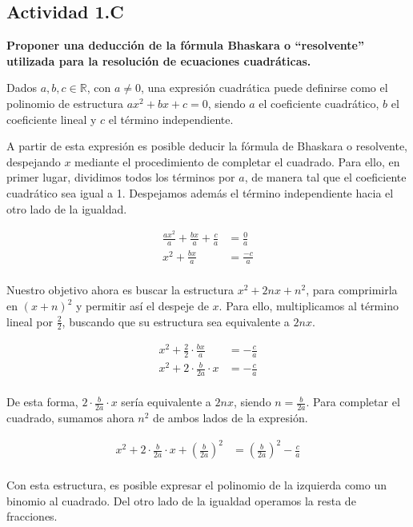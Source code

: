 \subsection*{Actividad 1.C}
\textbf{Proponer una deducción de la fórmula Bhaskara o “resolvente”
	utilizada para la resolución de ecuaciones cuadráticas.}

Dados $a, b, c \in \mathbb{R}$, con $a \neq 0$, una expresión cuadrática puede definirse como el polinomio de estructura $ax^2 + bx + c = 0$, siendo $a$ el coeficiente cuadrático, $b$ el coeficiente lineal y $c$ el término independiente.

A partir de esta expresión es posible deducir la fórmula de Bhaskara o resolvente, despejando $x$ mediante el procedimiento de completar el cuadrado. Para ello, en primer lugar, dividimos todos los términos por $a$, de manera tal que el coeficiente cuadrático sea igual a 1. Despejamos además el término independiente hacia el otro lado de la igualdad.

\begin{align*}
	\frac{ax^2}{a} + \frac{bx}{a} + \frac{c}{a} & = \frac{0}{a}  \\
	x^2 + \frac{bx}{a}                          & = \frac{-c}{a} \\
\end{align*}

Nuestro objetivo ahora es buscar la estructura $x^2 + 2nx + n^2$, para comprimirla en $(x+n)^2$ y permitir así el despeje de $x$. Para ello, multiplicamos al término lineal por $\frac{2}{2}$, buscando que su estructura sea equivalente a $2nx$.

\begin{align*}
	x^2 + \frac{2}{2} \cdot \frac{bx}{a} & = - \frac{c}{a} \\
	x^2 + 2 \cdot \frac{b}{2a} \cdot x   & = - \frac{c}{a} \\
\end{align*}

De esta forma, $2 \cdot \frac{b}{2a} \cdot x$ sería equivalente a $2nx$, siendo $n = \frac{b}{2a}$. Para completar el cuadrado, sumamos ahora $n^2$ de ambos lados de la expresión.

\begin{align*}
	x^2 + 2 \cdot \frac{b}{2a} \cdot x + \left(\frac{b}{2a}\right)^2 & = \left(\frac{b}{2a}\right)^2 - \frac{c}{a} \\
\end{align*}

Con esta estructura, es posible expresar el polinomio de la izquierda como un binomio al cuadrado. Del otro lado de la igualdad operamos la resta de fracciones.

